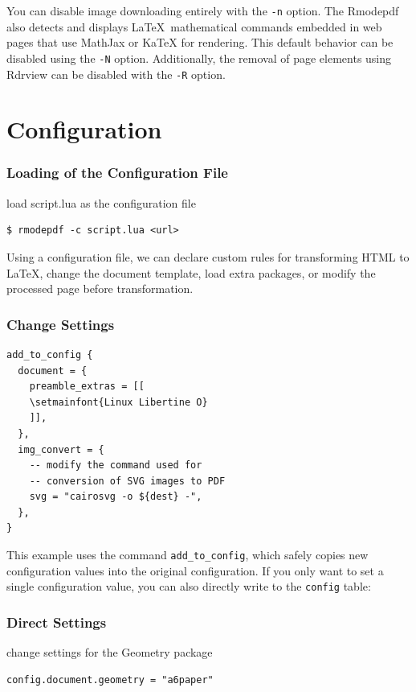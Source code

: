 You can disable image downloading entirely with the \texttt{-n} option. 
The Rmodepdf also detects and displays \LaTeX\ mathematical commands
embedded in web pages that use MathJax or KaTeX for
rendering. This default behavior can be disabled using the \texttt{-N} option.
Additionally, the removal of page elements using Rdrview can be
disabled with the \texttt{-R} option.


\section{Configuration}

\begin{frame}[fragile]
  \frametitle{Loading of the Configuration File}
  \begin{block}{load script.lua as the configuration file}
\begin{verbatim}
$ rmodepdf -c script.lua <url>
\end{verbatim}
\end{block}
\end{frame}

Using a configuration file, we can declare custom rules for transforming HTML
to \LaTeX, change the document template, load extra packages, or modify the
processed page before transformation.


\begin{frame}[fragile]
  \frametitle{Change Settings}
\begin{verbatim}
add_to_config {
  document = {
    preamble_extras = [[
    \setmainfont{Linux Libertine O}
    ]],
  },
  img_convert = {
    -- modify the command used for 
    -- conversion of SVG images to PDF
    svg = "cairosvg -o ${dest} -",
  },
}
\end{verbatim}


\end{frame}

This example uses the command \texttt{add\_to\_config}, which safely copies new
configuration values into the original configuration. If you only want to set a
single configuration value, you can also directly write to the \texttt{config}
table:

\begin{frame}[fragile]
  \frametitle{Direct Settings}
  \begin{block}{change settings for the Geometry package}
\begin{verbatim}
config.document.geometry = "a6paper"
\end{verbatim}
\end{block}
\end{frame}

